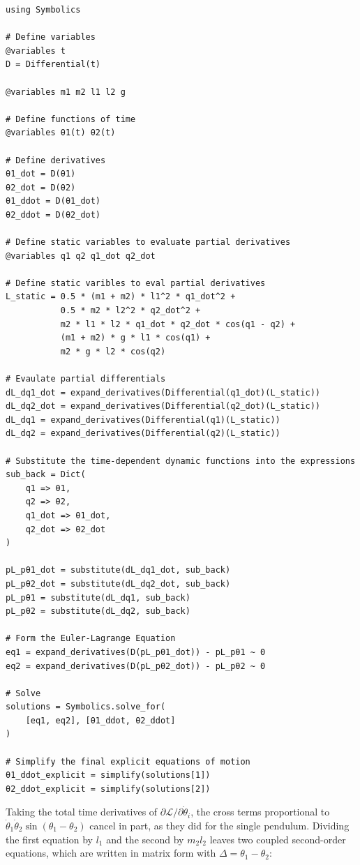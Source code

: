 \begin{verbatim}
using Symbolics

# Define variables
@variables t
D = Differential(t)

@variables m1 m2 l1 l2 g

# Define functions of time
@variables θ1(t) θ2(t)

# Define derivatives
θ1_dot = D(θ1)
θ2_dot = D(θ2)
θ1_ddot = D(θ1_dot)
θ2_ddot = D(θ2_dot)

# Define static variables to evaluate partial derivatives
@variables q1 q2 q1_dot q2_dot

# Define static varibles to eval partial derivatives
L_static = 0.5 * (m1 + m2) * l1^2 * q1_dot^2 + 
           0.5 * m2 * l2^2 * q2_dot^2 + 
           m2 * l1 * l2 * q1_dot * q2_dot * cos(q1 - q2) + 
           (m1 + m2) * g * l1 * cos(q1) + 
           m2 * g * l2 * cos(q2)

# Evaulate partial differentials
dL_dq1_dot = expand_derivatives(Differential(q1_dot)(L_static))
dL_dq2_dot = expand_derivatives(Differential(q2_dot)(L_static))
dL_dq1 = expand_derivatives(Differential(q1)(L_static))
dL_dq2 = expand_derivatives(Differential(q2)(L_static))

# Substitute the time-dependent dynamic functions into the expressions
sub_back = Dict(
    q1 => θ1,
    q2 => θ2,
    q1_dot => θ1_dot,
    q2_dot => θ2_dot
)

pL_pθ1_dot = substitute(dL_dq1_dot, sub_back)
pL_pθ2_dot = substitute(dL_dq2_dot, sub_back)
pL_pθ1 = substitute(dL_dq1, sub_back)
pL_pθ2 = substitute(dL_dq2, sub_back)

# Form the Euler-Lagrange Equation
eq1 = expand_derivatives(D(pL_pθ1_dot)) - pL_pθ1 ~ 0
eq2 = expand_derivatives(D(pL_pθ2_dot)) - pL_pθ2 ~ 0

# Solve
solutions = Symbolics.solve_for(
    [eq1, eq2], [θ1_ddot, θ2_ddot]
)

# Simplify the final explicit equations of motion
θ1_ddot_explicit = simplify(solutions[1])
θ2_ddot_explicit = simplify(solutions[2])    
\end{verbatim}

Taking the total time derivatives of $\partial\mathcal{L}/\partial\dot\theta_i$, the cross terms proportional to $\dot\theta_1\dot\theta_2\sin(\theta_1-\theta_2)$ cancel in part, as they did for the single pendulum. Dividing the first equation by $l_1$ and the second by $m_2l_2$ leaves two coupled second-order equations, which are written in matrix form with $\Delta = \theta_1-\theta_2$:


